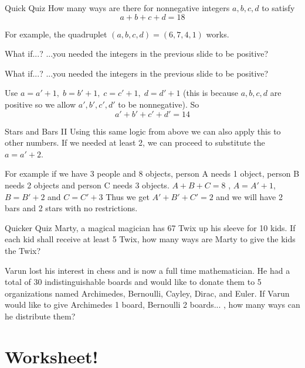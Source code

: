 \documentclass[aspectratio=169,xcolor=dvipsnames]{beamer}
\begin{document}
\begin{frame}[t]{Quick Quiz}
    How many ways are there for nonnegative integers $a,b,c,d$ to satisfy \[a+b+c+d=18\]  
    
    \vspace{2cm}
    
    For example, the quadruplet $(a,b,c,d)=(6,7,4,1)$ works.
\end{frame}

\begin{frame}[t]{What if...?}
    ...you needed the integers in the previous slide to be positive?

\end{frame}

\begin{frame}[t]{What if...?}
    ...you needed the integers in the previous slide to be positive?

    \vspace{2cm}

    Use $a=a'+1,\;b=b'+1,\;c=c'+1,\;d=d'+1$ (this is because $a,b,c,d$ are positive so we allow $a',b',c',d'$ to be nonnegative).
    So 
    \[
        a'+b'+c'+d'=14
    \]
\end{frame}

\begin{frame}[t]{Stars and Bars II}
    Using this same logic from above we can also apply this to other numbers. If we needed at least 2, we can proceed to substitute the $a=a'+2$.
    \vspace{2cm}

    For example if we have 3 people and 8 objects, person A needs 1 object, person B needs 2 objects and person C needs 3 objects. 
    $A+B+C=8$ , $A=A'+1$, $B=B'+2$ and $C=C'+3$
    Thus we get $A'+B'+C'=2$ and we will have 2 bars and 2 stars with no restrictions.

\end{frame}

\begin{frame}[t]{Quicker Quiz}
    Marty, a magical magician has 67 Twix up his sleeve for 10 kids. If each kid shall receive at least 5 Twix, how many ways are Marty to give the kids the Twix?
    \vspace{2cm}
    
    Varun lost his interest in chess and is now a full time mathematician. He had a total of 30 indistinguishable boards and would like to donate them to 5 organizations named Archimedes, Bernoulli, Cayley, Dirac, and Euler. If Varun would like to give Archimedes 1 board, Bernoulli 2 boards... , how many ways can he distribute them?
\end{frame}

\section{Worksheet!}
\end{document}
